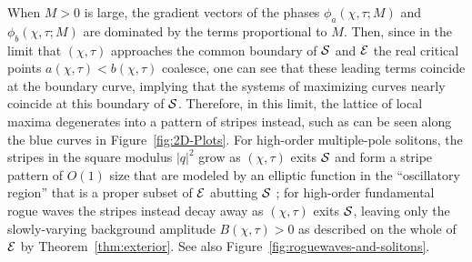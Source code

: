 When $M>0$ is large, the gradient vectors of the phases $\phi_a(\chi,\tau;M)$ and $\phi_b(\chi,\tau;M)$ are dominated by the terms proportional to $M$.  Then, since in the limit that $(\chi,\tau)$ approaches the common boundary of $\mathcal{S}$ and $\mathcal{E}$ the real critical points $a(\chi,\tau)<b(\chi,\tau)$ coalesce, one can see that these leading terms coincide at the boundary curve, implying that the systems of maximizing curves nearly coincide at this boundary of $\mathcal{S}$.  Therefore, in this limit, the lattice of local maxima degenerates into a pattern of stripes instead, such as can be seen along the blue curves in Figure~\ref{fig:2D-Plots}.  For high-order multiple-pole solitons, the stripes in the square modulus $|q|^2$ grow as $(\chi,\tau)$ exits $\mathcal{S}$ and form a stripe pattern of $O(1)$ size that are modeled by an elliptic function in the ``oscillatory region'' that is a proper subset of $\mathcal{E}$ abutting $\mathcal{S}$ \cite{BilmanBW19}; for high-order fundamental rogue waves the stripes instead decay away as $(\chi,\tau)$ exits $\mathcal{S}$, leaving only the slowly-varying background amplitude $B(\chi,\tau)>0$ as described on the whole of $\mathcal{E}$ by Theorem~\ref{thm:exterior}. See also Figure~\ref{fig:roguewaves-and-solitons}.

